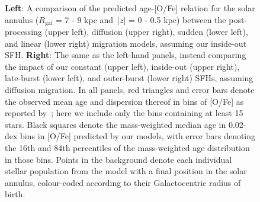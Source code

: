 \documentclass[fleqn, usenatbib]{mnras}
\begin{document}
\begin{figure}
\caption{
\textbf{Left}: A comparison of the predicted age-[O/Fe] relation for the solar 
annulus ($R_\text{gal}$ = 7 - 9 kpc and~$\left|z\right|$ = 0 - 0.5 kpc) between 
the post-processing (upper left), diffusion (upper right), sudden (lower left), 
and linear (lower right) migration models, assuming our inside-out SFH. 
\textbf{Right}: The same as the left-hand panels, instead comparing the impact 
of our constant (upper left), inside-out (upper right), late-burst (lower left), 
and outer-burst (lower right) SFHs, assuming diffusion migration. In all panels, 
red triangles and error bars denote the observed mean age and dispersion 
thereof in bins of [O/Fe] as reported by~\citet{Feuillet2019}; here we include 
only the bins containing at least 15 stars. Black squares denote the 
mass-weighted median age in 0.02-dex bins in [O/Fe] predicted by our models, 
with error bars denoting the 16th and 84th percentiles of the mass-weighted 
age distribution in those bins. Points in the background denote each individual 
stellar population from the model with a final position in the solar annulus, 
colour-coded according to their Galactocentric radius of birth. 
}
\label{fig:age_alpha} 
\end{figure} 
\end{document}
